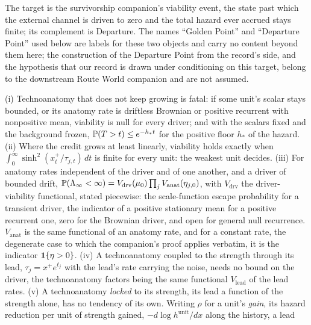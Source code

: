 \begin{definition}\label{imp:goldenpoint}
The target is the survivorship companion's viability event, the state
past which the external channel is driven to zero and the total hazard
ever accrued stays finite; its complement is Departure. The names
``Golden Point'' and ``Departure Point'' used below are labels for these
two objects and carry no content beyond them here; the construction of
the Departure Point from the record's side, and the hypothesis that our
record is drawn under conditioning on this target, belong to the
downstream Route World companion and are not assumed.
\end{definition}

\begin{theorem}
\label{imp:twocond}
(i) Technoanatomy that does not keep growing is fatal: if some unit's
scalar stays bounded, or its anatomy rate is driftless Brownian or
positive recurrent with nonpositive mean, viability is null for every
driver; and with the scalars fixed and the background frozen,
$\mathbb{P}(T>t)\le e^{-h_\ast t}$ for the positive floor $h_\ast$ of the hazard.
(ii) Where the credit grows at least linearly, viability holds exactly
when $\int_0^\infty\sinh^2(x_t^+/\tau_{j,t})\,dt$ is finite for every unit:
the weakest unit decides. (iii) For anatomy rates independent of the
driver and of one another, and a driver of bounded drift,
$\mathbb{P}(\Lambda_\infty<\infty)=V_{\mathrm{drv}}(\mu_0)\prod_jV_{\mathrm{anat}}(\eta_{j,0})$,
with $V_{\mathrm{drv}}$ the driver-viability functional, stated piecewise:
the scale-function escape probability for a transient driver, the
indicator of a positive stationary mean for a positive recurrent one,
zero for the Brownian driver, and open for general null recurrence.
$V_{\mathrm{anat}}$ is the same functional of an anatomy rate, and for a
constant rate, the degenerate case to which the companion's proof
applies verbatim, it is the indicator $\mathbf{1}\{\eta>0\}$. (iv) A
technoanatomy coupled to the strength through its lead,
$\tau_j=x^+e^{\ell_j}$ with the lead's rate carrying the noise, needs no
bound on the driver, the technoanatomy factors being the same functional
$V_{\mathrm{lead}}$ of the lead rates. (v) A technoanatomy \emph{locked}
to its strength, its lead a function of the strength alone, has no
tendency of its own. Writing $\rho$ for a unit's \emph{gain}, its hazard
reduction per unit of strength gained,
$-d\log h^{\mathrm{unit}}/dx$ along the history, a lead

\end{theorem}
